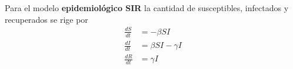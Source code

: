 \documentclass[20pt,margin=1in,innermargin=-4.5in,blockverticalspace=-0.25in]{tikzposter}
\begin{document}
\begin{columns}
{        Para el modelo \textbf{epidemiológico SIR} la cantidad de susceptibles, infectados y recuperados se rige por
        \begin{align}
            \frac{dS}{dt} &= -\beta S I \nonumber \\
            \frac{dI}{dt} &= \beta S I - \gamma I\\
            \frac{dR}{dt} &= \gamma I \nonumber
        \end{align}












    }
    
    \vspace{-0.1cm}
    
\end{columns}
\end{document}
